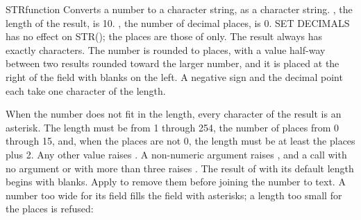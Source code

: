 \begin{XbaseEntry}{STR}{function}
Converts a number to a character string, as a character string.
\Syntax
{}
\Defaults
{}, the length of the result, is 10. , the number of decimal places, is 0. SET DECIMALS has no effect on STR(); the places are those of  only.
\Usage
The result always has exactly  characters. The number is rounded to  places, with a value half-way between two results rounded toward the larger number, and it is placed at the right of the field with blanks on the left. A negative sign and the decimal point each take one character of the length.

When the number does not fit in the length, every character of the result is an asterisk. The length must be from 1 through 254, the number of places from 0 through 15, and, when the places are not 0, the length must be at least the places plus 2. Any other value raises . A non-numeric argument raises , and a call with no argument or with more than three raises .
\Tips
The result of  with its default length begins with blanks. Apply  to remove them before joining the number to text.
\Examples
{}
A number too wide for its field fills the field with asterisks; a length too small for the places is refused:
\end{XbaseEntry}

